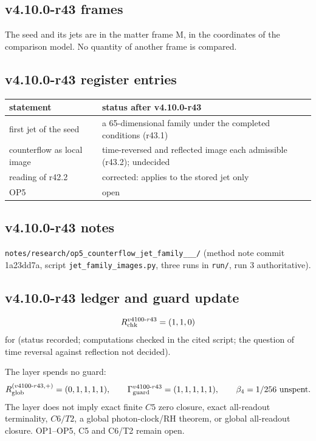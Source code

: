 \subsection*{v4.10.0-r43 frames}
\label{subsec:v4100-r43-frames}

The seed and its jets are in the matter frame M, in the coordinates of the comparison model.  No quantity of another frame is compared.

\subsection*{v4.10.0-r43 register entries}
\label{subsec:v4100-r43-register}

\begin{center}
\small
\begin{tabular}{@{}>{\raggedright\arraybackslash}p{}>{\raggedright\arraybackslash}p{}@{}}
\toprule
statement & status after v4.10.0-r43\\
\midrule
first jet of the seed & a 65-dimensional family under the completed conditions (r43.1)\\
counterflow as local image & time-reversed and reflected image each admissible (r43.2); undecided\\
reading of r42.2 & corrected: applies to the stored jet only\\
OP5 & open\\
\bottomrule
\end{tabular}
\end{center}

\subsection*{v4.10.0-r43 notes}
\label{subsec:v4100-r43-notes}

\texttt{notes/\allowbreak research/\allowbreak op5\_\allowbreak counterflow\_\allowbreak jet\_\allowbreak family\_\_\_/} (method note commit 1a23dd7a,
script \texttt{jet\_\allowbreak family\_\allowbreak images.py}, three runs in \texttt{run/}, run 3 authoritative).

\subsection*{v4.10.0-r43 ledger and guard update}
\label{subsec:v4100-r43-ledger-guard}

\[
R_{\rm chk}^{v4100\text{-}r43}=(1,1,0)
\]
for (status recorded; computations checked in the cited script; the question of time reversal against reflection not decided).

The layer spends no guard:
\[
R_{\rm glob}^{(v4100\text{-}r43,+)}=(0,1,1,1,1),
\qquad
\Gamma_{\rm guard}^{v4100\text{-}r43}=(1,1,1,1,1),
\qquad
\beta_4=1/256\ \text{unspent}.
\]
The layer does not imply exact finite \(C5\) zero closure, exact all-readout terminality, \(C6/T2\), a global photon-clock/RH theorem,
or global all-readout closure.  OP1--OP5, C5 and C6/T2 remain open.
